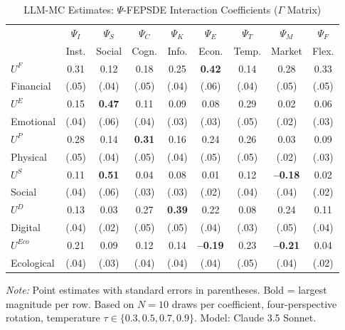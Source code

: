 \begin{table}[htbp]
\centering
\caption{LLM-MC Estimates: $\Psi$-FEPSDE Interaction Coefficients ($\Gamma$ Matrix)}
\label{tab:gamma-full}
\small
\begin{tabular}{@{}lcccccccc@{}}
\toprule
& $\Psi_I$ & $\Psi_S$ & $\Psi_C$ & $\Psi_K$ & $\Psi_E$ & $\Psi_T$ & $\Psi_M$ & $\Psi_F$ \\
& \tiny{Inst.} & \tiny{Social} & \tiny{Cogn.} & \tiny{Info.} & \tiny{Econ.} & \tiny{Temp.} & \tiny{Market} & \tiny{Flex.} \\
\midrule
$U^F$ & 0.31 & 0.12 & 0.18 & 0.25 & \textbf{0.42} & 0.14 & 0.28 & 0.33 \\
\tiny{Financial} & \tiny{(.05)} & \tiny{(.04)} & \tiny{(.05)} & \tiny{(.04)} & \tiny{(.06)} & \tiny{(.04)} & \tiny{(.05)} & \tiny{(.05)} \\
\addlinespace
$U^E$ & 0.15 & \textbf{0.47} & 0.11 & 0.09 & 0.08 & 0.29 & 0.02 & 0.06 \\
\tiny{Emotional} & \tiny{(.04)} & \tiny{(.06)} & \tiny{(.04)} & \tiny{(.03)} & \tiny{(.03)} & \tiny{(.05)} & \tiny{(.02)} & \tiny{(.03)} \\
\addlinespace
$U^P$ & 0.28 & 0.14 & \textbf{0.31} & 0.16 & 0.24 & 0.26 & 0.03 & 0.09 \\
\tiny{Physical} & \tiny{(.05)} & \tiny{(.04)} & \tiny{(.05)} & \tiny{(.04)} & \tiny{(.05)} & \tiny{(.05)} & \tiny{(.02)} & \tiny{(.03)} \\
\addlinespace
$U^S$ & 0.11 & \textbf{0.51} & 0.04 & 0.08 & 0.01 & 0.12 & \textbf{--0.18} & 0.02 \\
\tiny{Social} & \tiny{(.04)} & \tiny{(.06)} & \tiny{(.03)} & \tiny{(.03)} & \tiny{(.02)} & \tiny{(.04)} & \tiny{(.04)} & \tiny{(.02)} \\
\addlinespace
$U^D$ & 0.13 & 0.03 & 0.27 & \textbf{0.39} & 0.22 & 0.08 & 0.24 & 0.11 \\
\tiny{Digital} & \tiny{(.04)} & \tiny{(.02)} & \tiny{(.05)} & \tiny{(.05)} & \tiny{(.04)} & \tiny{(.03)} & \tiny{(.05)} & \tiny{(.04)} \\
\addlinespace
$U^{Eco}$ & 0.21 & 0.09 & 0.12 & 0.14 & \textbf{--0.19} & 0.23 & \textbf{--0.21} & 0.04 \\
\tiny{Ecological} & \tiny{(.04)} & \tiny{(.03)} & \tiny{(.04)} & \tiny{(.04)} & \tiny{(.04)} & \tiny{(.05)} & \tiny{(.04)} & \tiny{(.02)} \\
\bottomrule
\end{tabular}
\begin{flushleft}
\small\textit{Note:} Point estimates with standard errors in parentheses. Bold = largest magnitude per row. Based on $N=10$ draws per coefficient, four-perspective rotation, temperature $\tau \in \{0.3, 0.5, 0.7, 0.9\}$. Model: Claude 3.5 Sonnet.
\end{flushleft}
\end{table}

